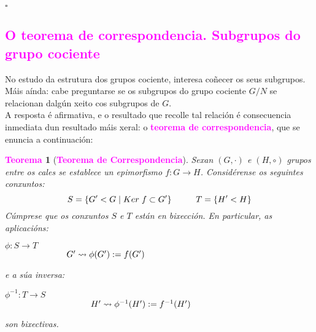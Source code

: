 \documentclass[twoside]{report}
\newcommand{\magbf}[1]{\textcolor{magenta}{\textbf{#1}}} %
\theoremstyle{mystyle}
\newtheorem{theo}{\magbf{Teorema}}[chapter]
\newenvironment{theorem}
{\begin{mdframed}[linecolor = magenta,backgroundcolor = classicrose, linewidth = 2mm]\begin{theo}}
{\end{theo}\end{mdframed}}
\begin{document}
\noindent $\square$

\textcolor{magenta}{\subsection{O teorema de correspondencia. Subgrupos do grupo cociente}}

\vspace{5mm}

\noindent No estudo da estrutura dos grupos cociente, interesa coñecer os seus subgrupos. Máis aínda: cabe preguntarse se os subgrupos do grupo cociente $G/N$ se relacionan dalgún xeito cos subgrupos de $G$.\\

\noindent A resposta é afirmativa, e o resultado que recolle tal relación é consecuencia inmediata dun resultado máis xeral: o \magbf{teorema de correspondencia}, que se enuncia a continuación:\pagebreak

\vspace{5mm}

\begin{theorem}[\magbf{Teorema de Correspondencia}] \label{th1.8}
Sexan $(G, \cdot)$ e $(H, \circ)$ grupos entre os cales se establece un epimorfismo $f: G \longrightarrow H$. Considérense os seguintes conxuntos:
$$S = \{G' < G \hspace{1mm} | \hspace{1mm} Ker \hspace{1mm} f \subset G'\} \hspace{10mm} T = \{H' < H\}$$
\noindent Cúmprese que os conxuntos $S$ e $T$ están en bixección. En particular, as aplicacións: 
    \begin{center}
            $\phi: S \longrightarrow T$ \\
        \vspace{2mm}
        $\hspace{25mm} G' \leadsto \phi(G') := f(G')$
    \end{center} 
\noindent e a súa inversa:
    \begin{center}
            $\phi^{-1}: T \longrightarrow S$ \\
        \vspace{2mm}
        $\hspace{35mm} H' \leadsto \phi^{-1}(H') := f^{-1}(H')$
    \end{center} 
\noindent son bixectivas.
\end{theorem}

\vspace{2mm}
\end{document}
